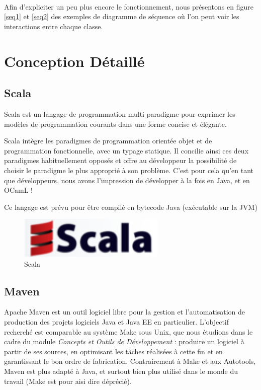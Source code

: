 \documentclass[a4paper,11pt]{article}
\begin{document}
 

\paragraph{}

Afin d'expliciter un peu plus encore le fonctionnement, nous présentons en figure \ref{seq1} et \ref{seq2} des exemples de diagramme de séquence où l'on peut voir les interactions entre chaque classe.






\section{Conception Détaillé}

\subsection{Scala}

Scala est un langage de programmation multi-paradigme pour exprimer les modèles de programmation courants dans une forme concise et élégante.

Scala intègre les paradigmes de programmation orientée objet et de programmation fonctionnelle, avec un typage statique. Il concilie ainsi ces deux paradigmes habituellement opposés et offre au développeur la possibilité de choisir le paradigme le plus approprié à son problème. C'est pour cela qu'en tant que développeurs, nous avons l'impression de développer à la fois en Java, et en OCamL !

Ce langage est prévu pour être compilé en bytecode Java (exécutable sur la JVM)

	\begin{figure}[!ht]
		\center
		\includegraphics [width=70mm]{./images/scala.png}
		\caption{Scala}
	\end{figure}

\subsection{Maven}
Apache Maven est un outil logiciel libre pour la gestion et l'automatisation de production des projets logiciels Java et Java EE en particulier. L'objectif recherché est comparable au système Make sous Unix, que nous étudions dans le cadre du module \textit{Concepts et Outils de Développement} : produire un logiciel à partir de ses sources, en optimisant les tâches réalisées à cette fin et en garantissant le bon ordre de fabrication. Contrairement à Make et aux Autotools, Maven est plus adapté à Java, et surtout bien plus utilisé dans le monde du travail (Make est pour aisi dire déprécié).
\end{document}
